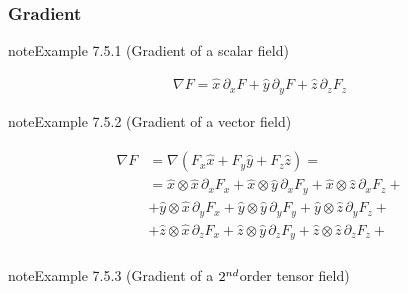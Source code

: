 \documentclass[letterpaper,10pt,english]{jupyterBook}
\begin{document}
\subsubsection{Gradient}
\label{\detokenize{ch/tensor-algebra-calculus/calculus-euclidean-cartesian:gradient}}\label{\detokenize{ch/tensor-algebra-calculus/calculus-euclidean-cartesian:tensor-calculus-cartesian-differential-operators-gradient}}\label{ch/tensor-algebra-calculus/calculus-euclidean-cartesian:example-0}
\begin{sphinxadmonition}{note}{Example 7.5.1 (Gradient of a scalar field)}


\begin{equation*}
\begin{split}\nabla F = \hat{x} \, \partial_x F + \hat{y} \, \partial_y F + \hat{z} \, \partial_z F_z\end{split}
\end{equation*}\end{sphinxadmonition}
\label{ch/tensor-algebra-calculus/calculus-euclidean-cartesian:example-1}
\begin{sphinxadmonition}{note}{Example 7.5.2 (Gradient of a vector field)}


\begin{equation*}
\begin{split}\begin{aligned}
\nabla F 
  & = \nabla (F_x \hat{x} + F_y \hat{y} + F_z \hat{z}) = \\
  & = \hat{x} \otimes \hat{x} \, \partial_x F_x + \hat{x} \otimes \hat{y} \, \partial_x F_y + \hat{x} \otimes \hat{z} \, \partial_x F_z + \\
  & + \hat{y} \otimes \hat{x} \, \partial_y F_x + \hat{y} \otimes \hat{y} \, \partial_y F_y + \hat{y} \otimes \hat{z} \, \partial_y F_z + \\
  & + \hat{z} \otimes \hat{x} \, \partial_z F_x + \hat{z} \otimes \hat{y} \, \partial_z F_y + \hat{z} \otimes \hat{z} \, \partial_z F_z + \\
\end{aligned}\end{split}
\end{equation*}\end{sphinxadmonition}
\label{ch/tensor-algebra-calculus/calculus-euclidean-cartesian:example-2}
\begin{sphinxadmonition}{note}{Example 7.5.3 (Gradient of a \protect\(2^{nd}\protect\)\sphinxhyphen{}order tensor field)}


\end{sphinxadmonition}
\end{document}
